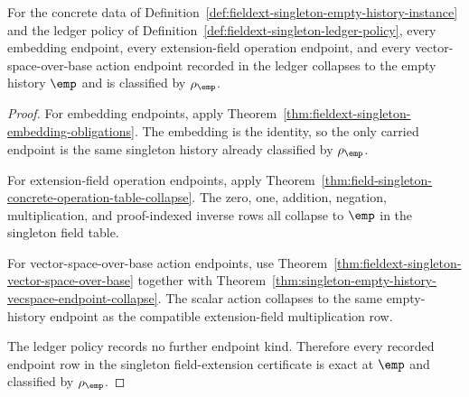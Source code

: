 \begin{theorem}
\label{thm:fieldext-singleton-exact-endpoint-ledger}
For the concrete data of
Definition~\ref{def:fieldext-singleton-empty-history-instance} and the ledger
policy of Definition~\ref{def:fieldext-singleton-ledger-policy}, every
embedding endpoint, every extension-field operation endpoint, and every
vector-space-over-base action endpoint recorded in the ledger collapses to the
empty history $\emp$ and is classified by $\rho_{\emp}$.
\end{theorem}
\begin{proof}
For embedding endpoints, apply
Theorem~\ref{thm:fieldext-singleton-embedding-obligations}. The embedding is
the identity, so the only carried endpoint is the same singleton history
already classified by $\rho_{\emp}$.

For extension-field operation endpoints, apply
Theorem~\ref{thm:field-singleton-concrete-operation-table-collapse}. The zero,
one, addition, negation, multiplication, and proof-indexed inverse rows all
collapse to $\emp$ in the singleton field table.

For vector-space-over-base action endpoints, use
Theorem~\ref{thm:fieldext-singleton-vector-space-over-base} together with
Theorem~\ref{thm:singleton-empty-history-vecspace-endpoint-collapse}. The
scalar action collapses to the same empty-history endpoint as the compatible
extension-field multiplication row.

The ledger policy records no further endpoint kind. Therefore every recorded
endpoint row in the singleton field-extension certificate is exact at $\emp$
and classified by $\rho_{\emp}$.
\end{proof}


